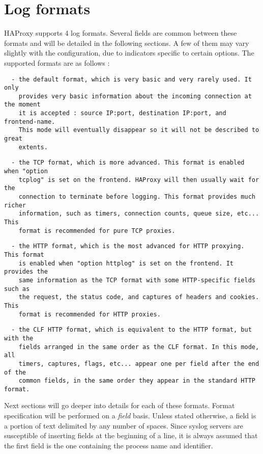 
\section{Log formats}

HAProxy supports 4 log formats. Several fields are common between these formats
and will be detailed in the following sections. A few of them may vary
slightly with the configuration, due to indicators specific to certain
options. The supported formats are as follows :

\begin{verbatim}
  - the default format, which is very basic and very rarely used. It only
    provides very basic information about the incoming connection at the moment
    it is accepted : source IP:port, destination IP:port, and frontend-name.
    This mode will eventually disappear so it will not be described to great
    extents.
\end{verbatim}

\begin{verbatim}
  - the TCP format, which is more advanced. This format is enabled when "option
    tcplog" is set on the frontend. HAProxy will then usually wait for the
    connection to terminate before logging. This format provides much richer
    information, such as timers, connection counts, queue size, etc... This
    format is recommended for pure TCP proxies.
\end{verbatim}

\begin{verbatim}
  - the HTTP format, which is the most advanced for HTTP proxying. This format
    is enabled when "option httplog" is set on the frontend. It provides the
    same information as the TCP format with some HTTP-specific fields such as
    the request, the status code, and captures of headers and cookies. This
    format is recommended for HTTP proxies.
\end{verbatim}

\begin{verbatim}
  - the CLF HTTP format, which is equivalent to the HTTP format, but with the
    fields arranged in the same order as the CLF format. In this mode, all
    timers, captures, flags, etc... appear one per field after the end of the
    common fields, in the same order they appear in the standard HTTP format.
\end{verbatim}


Next sections will go deeper into details for each of these formats. Format
specification will be performed on a \emph{field} basis. Unless stated otherwise, a
field is a portion of text delimited by any number of spaces. Since syslog
servers are susceptible of inserting fields at the beginning of a line, it is
always assumed that the first field is the one containing the process name and
identifier.

